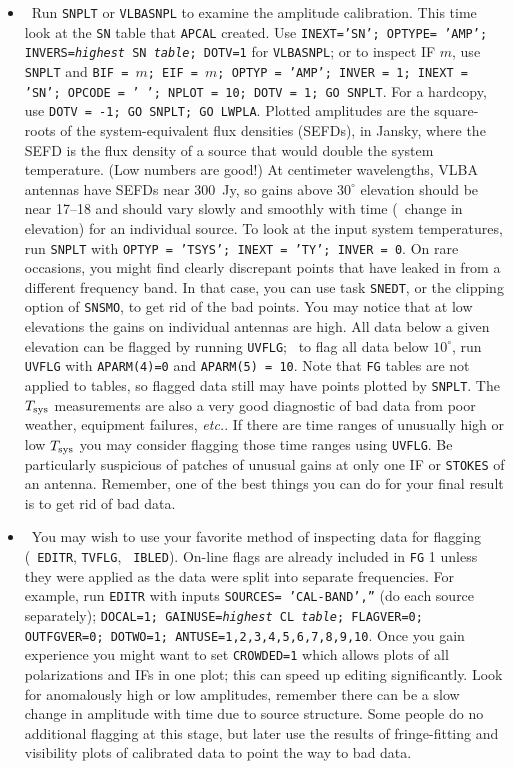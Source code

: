 \begin{enumerate}
\begin{itemize}
\item\ {Run {\tt SNPLT} or {\tt VLBASNPL} to examine the amplitude
calibration.  This time look at the {\tt SN} table that {\tt APCAL}
created.  Use {\tt INEXT='SN'; OPTYPE= 'AMP'; INVERS={\it highest} SN
{\it table}; DOTV=1} for {\tt VLBASNPL}; or to inspect IF $m$, use
{\tt SNPLT} and {\tt BIF = $m$; EIF = $m$; OPTYP = 'AMP'; INVER = 1;
INEXT = 'SN'; OPCODE = '~'; NPLOT = 10; DOTV = 1; GO SNPLT}\@.  For a
hardcopy, use {\tt DOTV = -1; GO SNPLT; GO LWPLA}\@.  Plotted
amplitudes are the square-roots of the system-equivalent flux
densities (SEFDs), in Jansky, where the SEFD is the flux density of a
source that would double the system temperature. (Low numbers are
good!)  At centimeter wavelengths, VLBA antennas have SEFDs near
300~Jy, so gains above $30^\circ$ elevation should be near 17--18 and
should vary slowly and smoothly with time (\ie\ change in elevation)
for an individual source.  To look at the input system temperatures,
run {\tt SNPLT} with {\tt OPTYP = 'TSYS'; INEXT = 'TY'; INVER = 0}\@.
On rare occasions, you might find clearly discrepant points that have
leaked in from a different frequency band. In that case, you can use
task {\tt SNEDT}, or the clipping option of {\tt SNSMO}, to get
rid of the bad points. You may notice that at low elevations the gains
on individual antennas are high.  All data below a given elevation can
be flagged by running {\tt UVFLG};  \eg\ to flag all data below
$10^\circ$, run {\tt UVFLG} with {\tt APARM(4)=0} and {\tt APARM(5) =
10}\@.  Note that {\tt FG} tables are not applied to tables, so
flagged data still may have points plotted by {\tt SNPLT}\@.  The
$T_{\rm sys}$ measurements are also a very good diagnostic of bad data
from poor weather, equipment failures, {\it etc.}.  If there are time
ranges of unusually high or low $T_{\rm sys}$ you may consider
flagging those time ranges using {\tt UVFLG}\@.  Be particularly
suspicious of patches of unusual gains at only one IF or {\tt STOKES}
of an antenna.  Remember, one of the best things you can do for
your final result is to get rid of bad data.}

\item\ {You may wish to use your favorite method of
inspecting data for flagging (\eg\ {\tt EDITR}, {\tt TVFLG}, {\tt
IBLED})\@.  On-line flags are already included in {\tt FG} 1 unless
they were applied as the data were split into separate frequencies.
For example, run {\tt EDITR}
with inputs {\tt SOURCES= 'CAL-BAND',''} (do each source separately);
{\tt DOCAL=1; GAINUSE={\it highest} CL {\it table}; FLAGVER=0;
OUTFGVER=0; DOTWO=1; ANTUSE=1,2,3,4,5,6,7,8,9,10}\@.  Once you gain
experience you might want to set {\tt CROWDED=1} which allows plots of
all polarizations and IFs in one plot; this can speed up editing
significantly.  Look for anomalously high or
low amplitudes, remember there can be a slow change in amplitude with
time due to source structure.  Some people do no additional flagging
at this stage, but later use the results of fringe-fitting and
visibility plots of calibrated data to point the way to bad data.
}
\end{itemize}


\end{enumerate}
